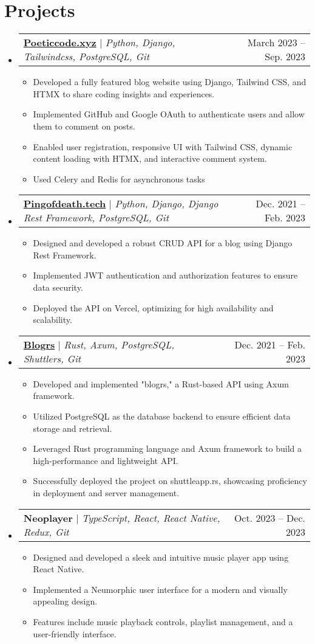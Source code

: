 \documentclass[letterpaper,12pt]{article}
\makeatletter
\newcommand{\resumeItem}[1]{
  \item\small{
    {#1 \vspace{-2pt}}
  }
}
\newcommand{\resumeProjectHeading}[2]{
    \item
    \begin{tabular*}{0.97\textwidth}{l@{\extracolsep{\fill}}r}
      \small#1 & #2 \\
    \end{tabular*}\vspace{-7pt}
}
\newcommand{\resumeSubHeadingListStart}{\begin{itemize}[leftmargin=0.15in, label={}]}
\newcommand{\resumeSubHeadingListEnd}{\end{itemize}}
\newcommand{\resumeItemListStart}{\begin{itemize}}
\newcommand{\resumeItemListEnd}{\end{itemize}\vspace{-5pt}}
\makeatother
\begin{document}
\section{Projects}
    \resumeSubHeadingListStart
      \resumeProjectHeading
          {\href{https://poeticcode.xyz}{\textbf{Poeticcode.xyz}} $|$ \emph{Python, Django, Tailwindcss, PostgreSQL, Git}}{March 2023 -- Sep. 2023}
          \resumeItemListStart
            \resumeItem{Developed a fully featured blog website using Django, Tailwind CSS, and HTMX to share coding insights and experiences.}
            \resumeItem{Implemented GitHub and Google OAuth to authenticate users and allow them to comment on posts.}
            \resumeItem{Enabled user registration, responsive UI with Tailwind CSS, dynamic content loading with HTMX, and interactive comment system.}
            \resumeItem{Used Celery and Redis for asynchronous tasks}
          \resumeItemListEnd
      \resumeProjectHeading
          {\href{https://pingofdeath.tech}{\textbf{Pingofdeath.tech}} $|$ \emph{Python, Django, Django Rest Framework, PostgreSQL, Git}}{Dec. 2021 -- Feb. 2023}
          \resumeItemListStart
            \resumeItem{Designed and developed a robust CRUD API for a blog using Django Rest Framework.}
            \resumeItem{Implemented JWT authentication and authorization features to ensure data security.}
            \resumeItem{Deployed the API on Vercel, optimizing for high availability and scalability.}
          \resumeItemListEnd
      \resumeProjectHeading
          {\href{https://blogrs.shuttleapp.rs/}{\textbf{Blogrs}} $|$ \emph{Rust, Axum, PostgreSQL, Shuttlers, Git}}{Dec. 2021 -- Feb. 2023}
          \resumeItemListStart
            \resumeItem{Developed and implemented "blogrs," a Rust-based API using Axum framework.}
            \resumeItem{Utilized PostgreSQL as the database backend to ensure efficient data storage and retrieval.}
            \resumeItem{Leveraged Rust programming language and Axum framework to build a high-performance and lightweight API.}
            \resumeItem{Successfully deployed the project on shuttleapp.rs, showcasing proficiency in deployment and server management.}
          \resumeItemListEnd
      \resumeProjectHeading
          {\textbf{Neoplayer} $|$ \emph{TypeScript, React, React Native, Redux, Git}}{Oct. 2023 -- Dec. 2023}
          \resumeItemListStart
            \resumeItem{Designed and developed a sleek and intuitive music player app using React Native.}
            \resumeItem{Implemented a Neumorphic user interface for a modern and visually appealing design.}
            \resumeItem{Features include music playback controls, playlist management, and a user-friendly interface.}
          \resumeItemListEnd
    \resumeSubHeadingListEnd
\end{document}
